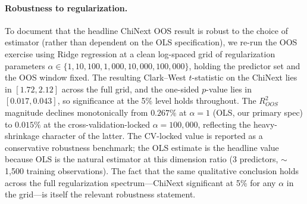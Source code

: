 \documentclass[AER]{AEA}
\begin{document}
\paragraph{Robustness to regularization.} To document that the headline ChiNext OOS result is robust to the choice of estimator (rather than dependent on the OLS specification), we re-run the OOS exercise using Ridge regression at a clean log-spaced grid of regularization parameters $\alpha \in \{1, 10, 100, 1{,}000, 10{,}000, 100{,}000\}$, holding the predictor set and the OOS window fixed. The resulting Clark--West $t$-statistic on the ChiNext lies in $[1.72, 2.12]$ across the full grid, and the one-sided $p$-value lies in $[0.017, 0.043]$, so significance at the 5\% level holds throughout. The $R^2_{OOS}$ magnitude declines monotonically from $0.267\%$ at $\alpha=1$ (OLS, our primary spec) to $0.015\%$ at the cross-validation-locked $\alpha=100{,}000$, reflecting the heavy-shrinkage character of the latter. The CV-locked value is reported as a conservative robustness benchmark; the OLS estimate is the headline value because OLS is the natural estimator at this dimension ratio (3 predictors, $\sim$1{,}500 training observations). The fact that the same qualitative conclusion holds across the full regularization spectrum---ChiNext significant at 5\% for any $\alpha$ in the grid---is itself the relevant robustness statement.
\end{document}
